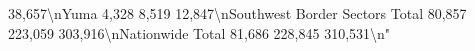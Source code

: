 \documentclass[
]{krantz}
\makeatletter
\newenvironment{Shaded}{\begin{snugshade}}{\end{snugshade}}
\newenvironment{kframe}{%
\medskip{}
\setlength{\fboxsep}{.8em}
 \def\at@end@of@kframe{}%
 \ifinner\ifhmode%
  \def\at@end@of@kframe{\end{minipage}}%
  \begin{minipage}{\columnwidth}%
 \fi\fi%
 \def\FrameCommand##1{\hskip\@totalleftmargin \hskip-\fboxsep
 \colorbox{shadecolor}{##1}\hskip-\fboxsep
     \hskip-\linewidth \hskip-\@totalleftmargin \hskip\columnwidth}%
 \MakeFramed {\advance\hsize-\width
   \@totalleftmargin\z@ \linewidth\hsize
   \@setminipage}}%
 {\par\unskip\endMakeFramed%
 \at@end@of@kframe}
\renewenvironment{Shaded}{\begin{kframe}}{\end{kframe}}
\makeatother
\begin{document}
\begin{Shaded}
\begin{Highlighting}[]
                 38,657\textbackslash{}nYuma                                            4,328                     8,519                     12,847\textbackslash{}nSouthwest Border Sectors Total                  80,857                   223,059                   303,916\textbackslash{}nNationwide Total                                81,686                   228,845                   310,531\textbackslash{}n"                                                                                                                                                                                                                                                                                                                                                                                                                                                                                                                                                                                                                                                                                                                                                                                                                                                                                                                                                                                                                                                                                                                                                                                                                                                                                                                                                                                                                                                                                                                                                                                                                                                                                                                                                                                                                                                                                                                                                                                                                                                                                                                                                                                                                                                                                                                                                                                                                                                                                                                                                                                                                                                                                                                                                                                                                                                                                                                                                                                                        
\end{Highlighting}
\end{Shaded}
\end{document}
